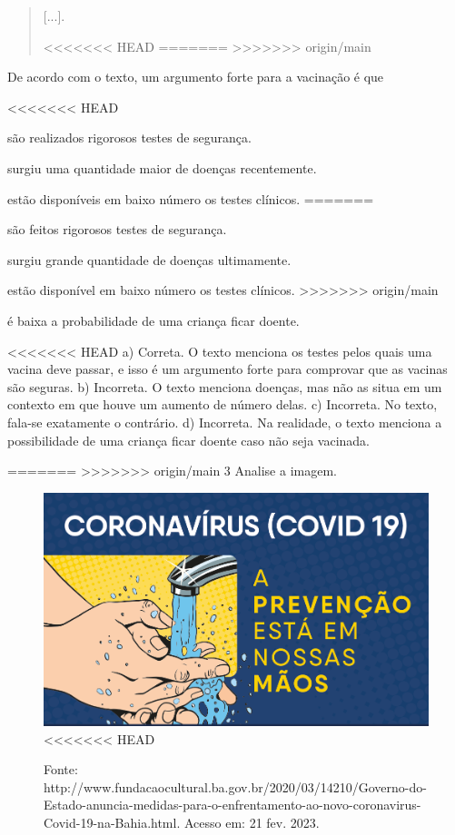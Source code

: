 {\begin{quote}
{[}...{]}.

<<<<<<< HEAD
=======
>>>>>>> origin/main
\end{quote}

De acordo com o texto, um argumento forte para a vacinação é que

\begin{escolha}
<<<<<<< HEAD
\item são realizados rigorosos testes de segurança.

\item surgiu uma quantidade maior de doenças recentemente.

\item estão disponíveis em baixo número os testes clínicos.
=======
\item são feitos rigorosos testes de segurança.

\item surgiu grande quantidade de doenças ultimamente.

\item estão disponível em baixo número os testes clínicos.
>>>>>>> origin/main

\item é baixa a probabilidade de uma criança ficar doente.
\end{escolha}


<<<<<<< HEAD
a) Correta. O texto menciona os testes pelos quais uma vacina deve
passar, e isso é um argumento forte para comprovar que as vacinas são seguras.
b) Incorreta. O texto menciona doenças, mas não as situa em um contexto em que houve um aumento de número delas.
c) Incorreta. No texto, fala-se exatamente o contrário.
d) Incorreta. Na realidade, o texto menciona a possibilidade de uma criança ficar
doente caso não seja vacinada.}

=======
>>>>>>> origin/main
\num{3} Analise a imagem.

\begin{figure}[htpb!]
\includegraphics[width=.5\textwidth]{./imgs/img15.png}
<<<<<<< HEAD
\caption{Fonte: http://www.fundacaocultural.ba.gov.br/2020/03/14210/Governo-do-Estado-anuncia-medidas-para-o-enfrentamento-ao-novo-coronavirus-Covid-19-na-Bahia.html. Acesso em: 21 fev. 2023.}
\end{figure}

